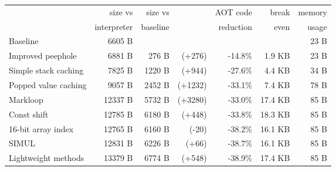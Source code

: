 
\begin{tabular}{lrrrrrr}
\toprule
                          & size vs     & size vs  &                      & AOT code  &   break & memory    \\
                          & interpreter & baseline &                      & reduction &   even  & usage     \\
\midrule
Baseline                  &     6605 B  &          &                      &           &         & 23 B      \\
Improved peephole         &     6881 B  &   276 B  & \scriptsize   (+276) &  -14.8\%  &  1.9 KB & 23 B      \\
Simple stack caching      &     7825 B  &  1220 B  & \scriptsize   (+944) &  -27.6\%  &  4.4 KB & 34 B      \\
Popped value caching      &     9057 B  &  2452 B  & \scriptsize  (+1232) &  -33.1\%  &  7.4 KB & 78 B      \\
Markloop                  &    12337 B  &  5732 B  & \scriptsize  (+3280) &  -33.0\%  & 17.4 KB & 85 B      \\
Const shift               &    12785 B  &  6180 B  & \scriptsize   (+448) &  -33.8\%  & 18.3 KB & 85 B      \\
16-bit array index        &    12765 B  &  6160 B  & \scriptsize    (-20) &  -38.2\%  & 16.1 KB & 85 B      \\
SIMUL                     &    12831 B  &  6226 B  & \scriptsize    (+66) &  -38.7\%  & 16.1 KB & 85 B      \\
Lightweight methods       &    13379 B  &  6774 B  & \scriptsize   (+548) &  -38.9\%  & 17.4 KB & 85 B      \\
\bottomrule
\end{tabular}